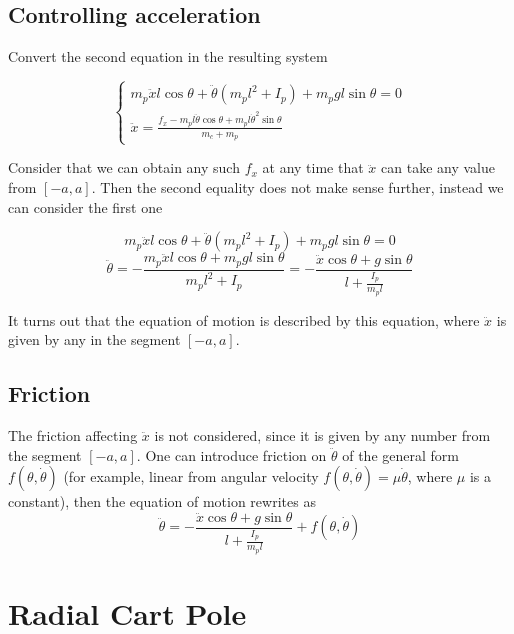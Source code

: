 \documentclass[unicode]{article}
\begin{document}
\subsection{Controlling acceleration}

Convert the second equation in the resulting system

\[
    \begin{cases}
        m_p \ddot{x} l \cos \theta + \ddot{\theta} \left(m_p l^2 + I_p\right) + m_p g l \sin \theta = 0          \\
        \ddot{x}  = \frac{f_{x} - m_p l \ddot{\theta} \cos \theta + m_p l \dot{\theta}^2 \sin \theta}{m_c + m_p}
    \end{cases}
\]

Consider that we can obtain any such \(f_x\) at any time that \(\ddot{x}\) can take any value from \([-a, a]\). Then the second equality does not make sense further, instead we can consider the first one

\[
    m_p \ddot{x} l \cos \theta + \ddot{\theta} \left(m_p l^2 + I_p\right) + m_p g l \sin \theta = 0
\]
\[
    \ddot{\theta} = - \frac{m_p \ddot{x} l \cos \theta + m_p g l \sin \theta}{m_p l^2 + I_p} = - \frac{\ddot{x} \cos \theta + g \sin \theta}{l + \frac{I_p}{m_pl}}
\]

It turns out that the equation of motion is described by this equation, where \(\ddot{x}\) is given by any in the segment \([-a, a]\).

\subsection{Friction}
The friction affecting \(\ddot{x}\) is not considered, since it is given by any number from the segment \([-a, a]\). One can introduce friction on \(\ddot{\theta}\) of the general form \(f(\theta, \dot{\theta})\) (for example, linear from angular velocity \(f(\theta, \dot{\theta}) = \mu \dot{\theta}\), where \(\mu\) is a constant), then the equation of motion rewrites as
\[
    \ddot{\theta} = - \frac{\ddot{x} \cos \theta + g \sin \theta}{l + \frac{I_p}{m_pl}} + f(\theta, \dot{\theta})
\]

\newpage
\section{Radial Cart Pole}

\begin{center}
    
\end{center}
\end{document}
